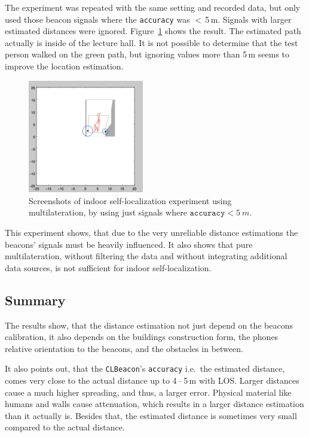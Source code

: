 The experiment was repeated with the same setting and recorded data, but only used those beacon signals where the \texttt{accuracy} was $<$\,5\,m. Signals with larger estimated distances were ignored. Figure~\ref{fig:beacon_eval_multilat_less5m} shows the result. The estimated path actually is inside of the lecture hall. It is not possible to determine that the test person walked on the green path, but ignoring values more than 5\,m seems to improve the location estimation.

\begin{figure}
	\includegraphics[width=0.45\textwidth]{figures/multilat_less5m}
	\caption{Screenshots of indoor self-localization experiment using multilateration, by using just signals where $\texttt{accuracy} < 5~m$.}
	\label{fig:beacon_eval_multilat_less5m}
\end{figure}

This experiment shows, that due to the very unreliable distance estimations the beacons' signals must be heavily influenced. It also shows that pure multilateration, without filtering the data and without integrating additional data sources, is not sufficient for indoor self-localization.

\subsection{Summary}
The results show, that the distance estimation not just depend on the beacons calibration, it also depends on the buildings construction form, the phones relative orientation to the beacons, and the obstacles in between.

It also points out, that the \texttt{CLBeacon}'s \texttt{accuracy} i.e.\ the estimated distance, comes very close to the actual distance up to 4\,--\,5\,m with \acs{LOS}. Larger distances cause a much higher spreading, and thus, a larger error. Physical material like humans and walls cause attenuation, which results in a larger distance estimation than it actually is. Besides that, the estimated distance is sometimes very small compared to the actual distance.


